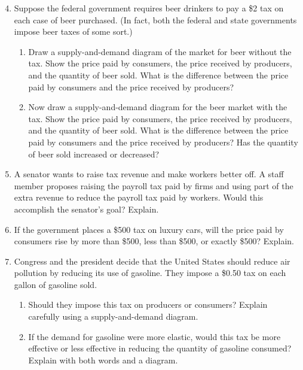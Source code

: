 \documentclass{article}
\begin{document}
\begin{enumerate}

\setcounter{enumi}{3}

\item Suppose the federal government requires beer drinkers to pay a \$2 tax on each case of beer purchased. (In fact, both the federal and state governments impose beer taxes of some sort.)

	\begin{enumerate}
	
	\item Draw a supply-and-demand diagram of the market for beer without the tax. Show the price paid by consumers, the price received by producers, and the quantity of beer sold. What is the difference between the price paid by consumers and the price received by producers?
	
	\item Now draw a supply-and-demand diagram for the beer market with the tax. Show the price paid by consumers, the price received by producers, and the quantity of beer sold. What is the difference between the price paid by consumers and the price received by producers? Has the quantity of beer sold increased or decreased?
	
	\end{enumerate}
	
\item A senator wants to raise tax revenue and make workers better off. A staff member proposes raising the payroll tax paid by firms and using part of the extra revenue to reduce the payroll tax paid by workers. Would this accomplish the senator's goal? Explain.

\item If the government places a \$500 tax on luxury cars, will the price paid by consumers rise by more than \$500, less than \$500, or exactly \$500? Explain.

\item Congress and the president decide that the United States should reduce air pollution by reducing its use of gasoline. They impose a \$0.50 tax on each gallon of gasoline sold.

	\begin{enumerate}
	
	\item Should they impose this tax on producers or consumers? Explain carefully using a supply-and-demand diagram.
	
	\item If the demand for gasoline were more elastic, would this tax be more effective or less effective in reducing the quantity of gasoline consumed? Explain with both words and a diagram.
	

\end{enumerate}
\end{enumerate}
\end{document}
